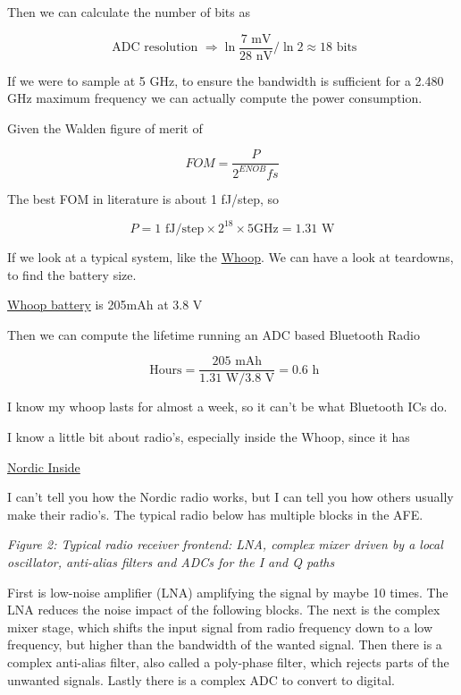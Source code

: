 Then we can calculate the number of bits as

\[ \text{ ADC resolution }\Rightarrow  \ln{ \frac{7 \text{ mV}}{28 \text{ nV}} }/\ln{2} \approx 18 \text{ bits}\]

If we were to sample at 5 GHz, to ensure the bandwidth is sufficient for
a 2.480 GHz maximum frequency we can actually compute the power
consumption.

Given the Walden figure of merit of

\[FOM = \frac{P}{2^{ENOB}fs}\]

The best FOM in literature is about 1 fJ/step, so

\[P = 1\text{ fJ/step} \times 2^{18} \times 5\text{GHz} = 1.31\text{ W}\]

If we look at a typical system, like the
\href{https://www.whoop.com/eu/en/}{Whoop}. We can have a look at
teardowns, to find the battery size.

\href{https://fccid.io/2AJ2X-WS30/Internal-Photos/Internal-Photos-4265037.pdf}{Whoop
battery} is 205mAh at 3.8 V

Then we can compute the lifetime running an ADC based Bluetooth Radio

\[\text{ Hours} = \frac{ 205 \text{ mAh}}{1.31\text{ W}/3.8\text{ V}} = 0.6\text{ h}\]

I know my whoop lasts for almost a week, so it can't be what Bluetooth
ICs do.

I know a little bit about radio's, especially inside the Whoop, since it
has

\href{https://www.nordicsemi.com/Nordic-news/2022/07/the-whoop-4-uses-nordics-nrf52840-soc}{Nordic
Inside}

I can't tell you how the Nordic radio works, but I can tell you how
others usually make their radio's. The typical radio below has multiple
blocks in the AFE.


{
\centering
{}
}

\emph{Figure 2: Typical radio receiver frontend: LNA, complex mixer
driven by a local oscillator, anti-alias filters and ADCs for the I and
Q paths}

First is low-noise amplifier (LNA) amplifying the signal by maybe 10
times. The LNA reduces the noise impact of the following blocks. The
next is the complex mixer stage, which shifts the input signal from
radio frequency down to a low frequency, but higher than the bandwidth
of the wanted signal. Then there is a complex anti-alias filter, also
called a poly-phase filter, which rejects parts of the unwanted signals.
Lastly there is a complex ADC to convert to digital.

